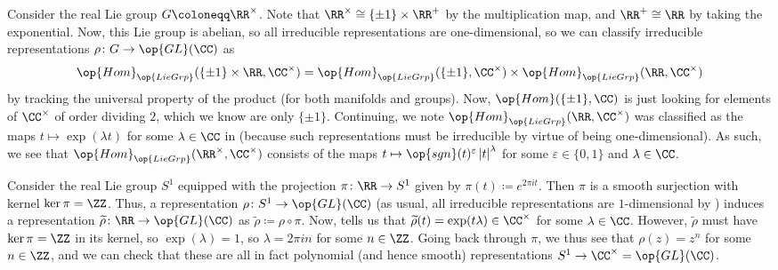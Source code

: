 \documentclass[../notes.tex]{subfiles}
\begin{document}
\begin{example} \label{ex:irreps-gm-r}
	Consider the real Lie group $G\coloneqq\RR^\times$. Note that $\RR^\times\cong\{\pm1\}\times\RR^+$ by the multiplication map, and $\RR^+\cong\RR$ by taking the exponential. Now, this Lie group is abelian, so all irreducible representations are one-dimensional, so we can classify irreducible representations $\rho\colon G\to\op{GL}(\CC)$ as
	\[\op{Hom}_{\op{LieGrp}}(\{\pm1\}\times\RR,\CC^\times)=\op{Hom}_{\op{LieGrp}}(\{\pm1\},\CC^\times)\times\op{Hom}_{\op{LieGrp}}(\RR,\CC^\times)\]
	by tracking the universal property of the product (for both manifolds and groups). Now, $\op{Hom}(\{\pm1\},\CC)$ is just looking for elements of $\CC^\times$ of order dividing $2$, which we know are only $\{\pm1\}$. Continuing, we note $\op{Hom}_{\op{LieGrp}}(\RR,\CC^\times)$ was classified as the maps $t\mapsto\exp(\lambda t)$ for some $\lambda\in\CC$ in  (because such representations must be irreducible by virtue of being one-dimensional). As such, we see that $\op{Hom}_{\op{LieGrp}}(\RR^\times,\CC^\times)$ consists of the maps $t\mapsto\op{sgn}(t)^\varepsilon\left|t\right|^\lambda$ for some $\varepsilon\in\{0,1\}$ and $\lambda\in\CC$.
\end{example}
\begin{example}
	Consider the real Lie group $S^1$ equipped with the projection $\pi\colon\RR\to S^1$ given by $\pi(t)\coloneqq e^{2\pi it}$. Then $\pi$ is a smooth surjection with kernel $\ker\pi=\ZZ$. Thus, a representation $\rho\colon S^1\to\op{GL}(\CC)$ (as usual, all irreducible representations are $1$-dimensional by ) induces a representation $\widetilde\rho\colon\RR\to\op{GL}(\CC)$ as $\widetilde\rho\coloneqq\rho\circ\pi$. Now,  tells us that $\widetilde\rho(t)=\exp(t\lambda)\in\CC^\times$ for some $\lambda\in\CC$. However, $\widetilde\rho$ must have $\ker\pi=\ZZ$ in its kernel, so $\exp(\lambda)=1$, so $\lambda=2\pi in$ for some $n\in\ZZ$. Going back through $\pi$, we thus see that $\rho(z)=z^n$ for some $n\in\ZZ$, and we can check that these are all in fact polynomial (and hence smooth) representations $S^1\to\CC^\times=\op{GL}(\CC)$.
\end{example}
\end{document}
